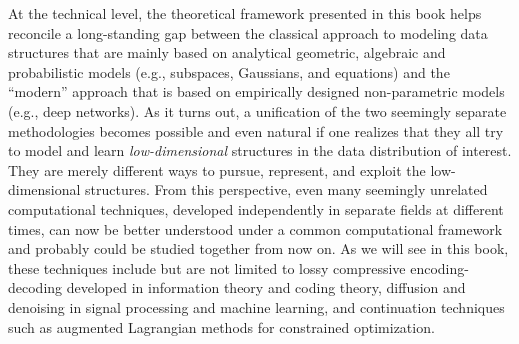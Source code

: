 \documentclass[../../book-main.tex]{subfiles}
\begin{document}
At the technical level, the theoretical framework presented in this book helps reconcile a long-standing gap between the classical approach to modeling data structures that are mainly based on analytical geometric, algebraic and probabilistic models (e.g., subspaces, Gaussians, and equations) and the ``modern'' approach that is based on empirically designed non-parametric models (e.g., deep networks). As it turns out, a unification of the two seemingly separate methodologies becomes possible and even natural if one realizes that they all try to model and learn {\em low-dimensional} structures in the data distribution of interest. They are merely different ways to pursue, represent, and exploit the low-dimensional structures. From this perspective, even many seemingly unrelated computational techniques, developed independently in separate fields at different times, can now be better understood under a common computational framework and probably could be studied together from now on. As we will see in this book, these techniques include but are not limited to lossy compressive encoding-decoding developed in information theory and coding theory, diffusion and denoising in signal processing and machine learning, and continuation techniques such as augmented Lagrangian methods for constrained optimization. 
\end{document}
